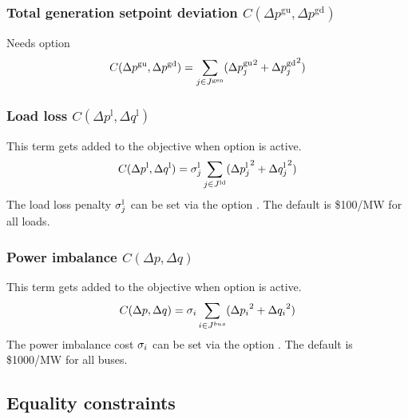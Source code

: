 \subsubsection{Total generation setpoint deviation $C(\Delta p^{\text{gu}},\Delta p^{\text{gd}})$}
Needs \opflowoption{\opflowobjective}{\mingensetpointdeviation} option
\begin{equation}
C(\Delta p^{\text{gu}},\Delta p^{\text{gd}}) = \sum_{j \in J^\text{gen}} ({\Delta{p}^\text{gu}_j}^2 + {\Delta{p}^\text{gd}_j}^2)
\label{eq:opf_obj_mingensetpointdev}
\end{equation}

\subsubsection{Load loss $C(\Delta p^{\text{l}},\Delta q^{\text{l}})$}
This term gets added to the objective when  \option{\opflowincludeloadloss} option is active. 
\begin{equation}
C(\Delta p^{\text{l}},\Delta q^{\text{l}}) = \sigma^\text{l}_j \sum_{j \in J^\text{ld}} ({\Delta{p}^{\text{l}}_j}^2 + {\Delta{q}^{\text{l}}_j}^2)
\label{eq:opf_obj_minloadloss}
\end{equation}
The load loss penalty $\sigma^\text{l}_j$ can be set via the option . The default is \$100/MW for all loads.

\subsubsection{Power imbalance $C(\Delta p,\Delta q)$}
This term gets added to the objective when   option is active. 
\begin{equation}
C(\Delta p,\Delta q) = \sigma_i \sum_{i \in J^{bus}} ({\Delta p_i}^2 + {\Delta q_i}^2)
\label{eq:opf_obj_minpowerimbalance}
\end{equation}
The power imbalance cost $\sigma_i$ can be set via the option . The default is \$1000/MW for all buses.

\subsection{Equality constraints}\label{sec:opflow_eq}

